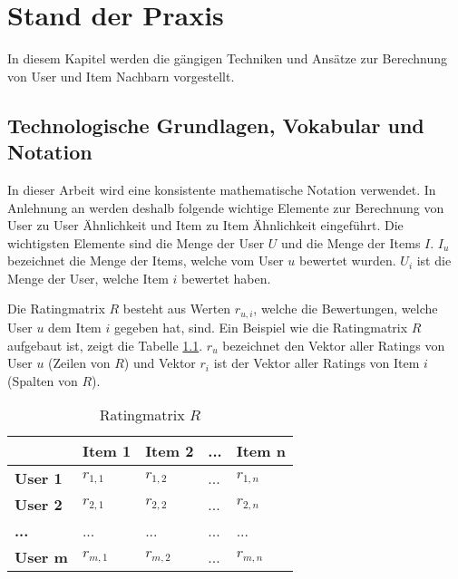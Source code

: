 \chapter{Stand der Praxis}
\label{ch:StandDerPraxis}


In diesem Kapitel werden die gängigen Techniken und Ansätze zur Berechnung von User und Item Nachbarn vorgestellt.

\section{Technologische Grundlagen, Vokabular und Notation}
In dieser Arbeit wird eine konsistente mathematische Notation verwendet. In Anlehnung an \cite{Ekstrand2011} werden deshalb folgende wichtige Elemente zur Berechnung von User zu User Ähnlichkeit und Item zu Item Ähnlichkeit eingeführt. Die wichtigsten Elemente sind die Menge der User $U$ und die Menge der Items $I$. $I_u$ bezeichnet die Menge der Items, welche vom User $u$ bewertet wurden. $U_i$ ist die Menge der User, welche Item $i$ bewertet haben.

Die Ratingmatrix $R$ besteht aus Werten $r_{u,i}$, welche die Bewertungen, welche User $u$ dem Item $i$ gegeben hat, sind. Ein Beispiel wie die Ratingmatrix $R$ aufgebaut ist, zeigt die Tabelle \ref{Ratingmatrix}.
$r_u$ bezeichnet den Vektor aller Ratings von User $u$ (Zeilen von $R$) und Vektor $r_i$ ist der Vektor aller Ratings von Item $i$ (Spalten von $R$).

\begin{table}[htb]
    \caption{Ratingmatrix $R$}
    \label{Ratingmatrix}
    \begin{tabularx}{\textwidth}{|X|X|X|X|X|}
    	\hline 
    	\textbf{} & \textbf{Item 1} & \textbf{Item 2} & \textbf{...}& \textbf{Item n} \\
    	\hline 
    	\textbf{User 1}& $r_{1,1}$ & $r_{1,2}$ & ... & $r_{1,n}$\\ 
    	\hline 
    	\textbf{User 2} &  $r_{2,1}$ & $r_{2,2}$ & ... & $r_{2,n}$\\ 
    	\hline
    	\textbf{...}& ... & ... & ... & ...\\
    	\hline
    	\textbf{User m} &  $r_{m,1}$ & $r_{m,2}$ & ... & $r_{m,n}$\\
    	\hline
    \end{tabularx}
\end{table}


